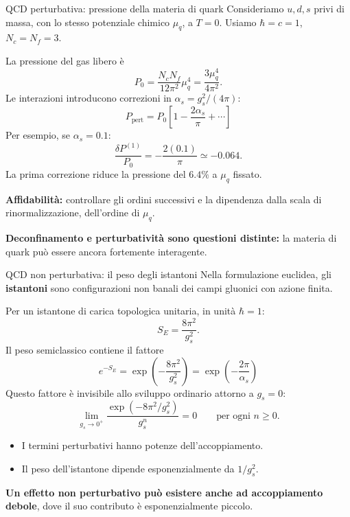 \begin{frame}{QCD perturbativa: pressione della materia di quark}
\small
Consideriamo \(u,d,s\) privi di massa, con lo stesso potenziale
chimico \(\mu_q\), a \(T=0\).
Usiamo \(\hbar=c=1\), \(N_c=N_f=3\).

\medskip
La pressione del gas libero è
\[
P_0=\frac{N_cN_f}{12\pi^2}\mu_q^4
=\frac{3\mu_q^4}{4\pi^2}.
\]
Le interazioni introducono correzioni in
\(\alpha_s=g_s^2/(4\pi)\):
\[
\boxed{
P_{\mathrm{pert}}
=P_0\left[1-\frac{2\alpha_s}{\pi}+\cdots\right]
}
\]
Per esempio, se \(\alpha_s=0.1\):
\[
\frac{\delta P^{(1)}}{P_0}
=-\frac{2(0.1)}{\pi}\simeq-0.064.
\]
La prima correzione riduce la pressione del \(6.4\%\)
a \(\mu_q\) fissato.

\medskip
\textbf{Affidabilità:} controllare gli ordini successivi e la
dipendenza dalla scala di rinormalizzazione, dell'ordine di \(\mu_q\).

\textbf{Deconfinamento e perturbatività sono questioni distinte:}
la materia di quark può essere ancora fortemente interagente.
\end{frame}


\begin{frame}{QCD non perturbativa: il peso degli istantoni}
\small
Nella formulazione euclidea, gli \textbf{istantoni} sono
configurazioni non banali dei campi gluonici con azione finita.

Per un istantone di carica topologica unitaria,
in unità \(\hbar=1\):
\[
S_E=\frac{8\pi^2}{g_s^2}.
\]
Il peso semiclassico contiene il fattore
\[
\boxed{
e^{-S_E}
=\exp\!\left(-\frac{8\pi^2}{g_s^2}\right)
=\exp\!\left(-\frac{2\pi}{\alpha_s}\right)
}
\]
Questo fattore è invisibile allo sviluppo ordinario attorno a \(g_s=0\):
\[
\lim_{g_s\to0^+}
\frac{\exp(-8\pi^2/g_s^2)}{g_s^n}=0
\qquad\text{per ogni }n\geq0.
\]
\begin{itemize}
\item I termini perturbativi hanno potenze dell'accoppiamento.
\item Il peso dell'istantone dipende esponenzialmente da \(1/g_s^2\).
\end{itemize}

\textbf{Un effetto non perturbativo può esistere anche
ad accoppiamento debole}, dove il suo contributo è
esponenzialmente piccolo.
\end{frame}
